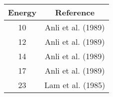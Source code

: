 \begin{tabular}{|c||c|} 
    \hline 
    \bf{Energy} & \bf{Reference} \\
    \hline
    \hline 
    10 & Anli et al. (1989) \cite{Anli1989}\\
    12 & Anli et al. (1989) \cite{Anli1989}\\
    14 & Anli et al. (1989) \cite{Anli1989}\\
    17 & Anli et al. (1989) \cite{Anli1989}\\
    23 & Lam et al. (1985) \cite{Lam1985}\\
    \hline
\end{tabular}

